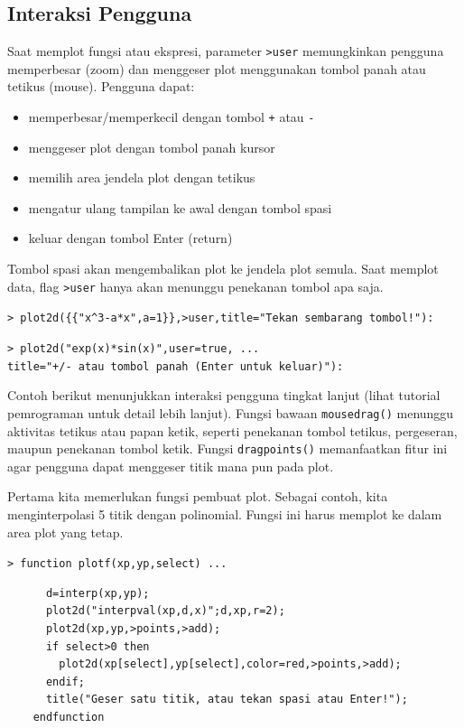 \documentclass[11pt, a4paper]{article}
\newcommand{\emtcmd}[1]{\noindent\texttt{\textcolor{emtcommand}{>}\ #1}\par\smallskip}
\begin{document}
\subsection*{Interaksi Pengguna}

Saat memplot fungsi atau ekspresi, parameter \texttt{>user} memungkinkan pengguna memperbesar (zoom) dan menggeser plot menggunakan tombol panah atau tetikus (mouse). Pengguna dapat:
\begin{itemize}
    \item memperbesar/memperkecil dengan tombol \texttt{+} atau \texttt{-}
    \item menggeser plot dengan tombol panah kursor
    \item memilih area jendela plot dengan tetikus
    \item mengatur ulang tampilan ke awal dengan tombol spasi
    \item keluar dengan tombol Enter (return)
\end{itemize}

Tombol spasi akan mengembalikan plot ke jendela plot semula. Saat memplot data, flag \texttt{>user} hanya akan menunggu penekanan tombol apa saja.

\emtcmd{plot2d(\{\{"x\^{}3-a*x",a=1\}\},>user,title="Tekan sembarang tombol!"):}
\emtcmd{plot2d("exp(x)*sin(x)",user=true, ... \\
\hspace*{1em} title="+/- atau tombol panah (Enter untuk keluar)"):}

Contoh berikut menunjukkan interaksi pengguna tingkat lanjut (lihat tutorial pemrograman untuk detail lebih lanjut). Fungsi bawaan \texttt{mousedrag()} menunggu aktivitas tetikus atau papan ketik, seperti penekanan tombol tetikus, pergeseran, maupun penekanan tombol ketik. Fungsi \texttt{dragpoints()} memanfaatkan fitur ini agar pengguna dapat menggeser titik mana pun pada plot.

Pertama kita memerlukan fungsi pembuat plot. Sebagai contoh, kita menginterpolasi 5 titik dengan polinomial. Fungsi ini harus memplot ke dalam area plot yang tetap.

\emtcmd{function plotf(xp,yp,select) ...}
\begin{verbatim}
      d=interp(xp,yp);
      plot2d("interpval(xp,d,x)";d,xp,r=2);
      plot2d(xp,yp,>points,>add);
      if select>0 then
        plot2d(xp[select],yp[select],color=red,>points,>add);
      endif;
      title("Geser satu titik, atau tekan spasi atau Enter!");
    endfunction
\end{verbatim}
\end{document}
